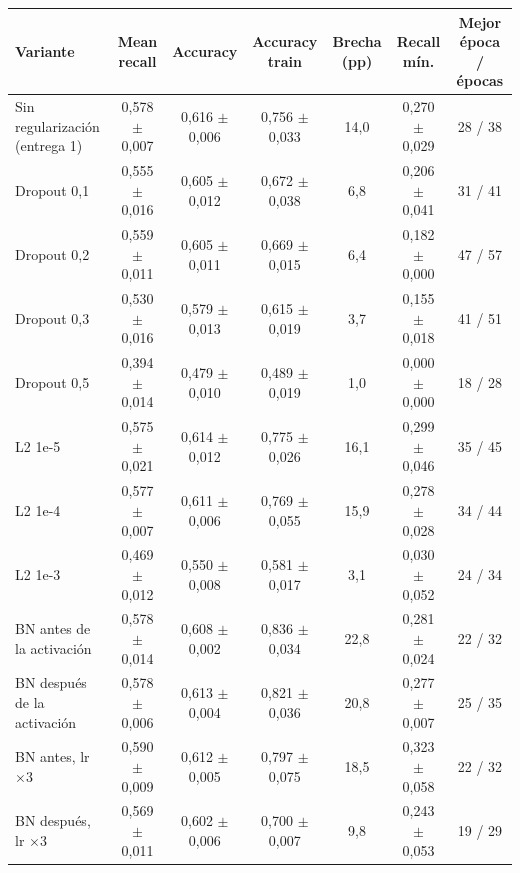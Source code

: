\begin{tabular}{lcccccc}
\toprule
Variante & Mean recall & Accuracy & Accuracy train & Brecha (pp) & Recall mín. & Mejor época / épocas \\
\midrule
Sin regularización (entrega 1) & 0,578 $\pm$ 0,007 & 0,616 $\pm$ 0,006 & 0,756 $\pm$ 0,033 & 14,0 & 0,270 $\pm$ 0,029 & 28 / 38 \\
Dropout 0,1 & 0,555 $\pm$ 0,016 & 0,605 $\pm$ 0,012 & 0,672 $\pm$ 0,038 & 6,8 & 0,206 $\pm$ 0,041 & 31 / 41 \\
Dropout 0,2 & 0,559 $\pm$ 0,011 & 0,605 $\pm$ 0,011 & 0,669 $\pm$ 0,015 & 6,4 & 0,182 $\pm$ 0,000 & 47 / 57 \\
Dropout 0,3 & 0,530 $\pm$ 0,016 & 0,579 $\pm$ 0,013 & 0,615 $\pm$ 0,019 & 3,7 & 0,155 $\pm$ 0,018 & 41 / 51 \\
Dropout 0,5 & 0,394 $\pm$ 0,014 & 0,479 $\pm$ 0,010 & 0,489 $\pm$ 0,019 & 1,0 & 0,000 $\pm$ 0,000 & 18 / 28 \\
L2 1e-5 & 0,575 $\pm$ 0,021 & 0,614 $\pm$ 0,012 & 0,775 $\pm$ 0,026 & 16,1 & 0,299 $\pm$ 0,046 & 35 / 45 \\
L2 1e-4 & 0,577 $\pm$ 0,007 & 0,611 $\pm$ 0,006 & 0,769 $\pm$ 0,055 & 15,9 & 0,278 $\pm$ 0,028 & 34 / 44 \\
L2 1e-3 & 0,469 $\pm$ 0,012 & 0,550 $\pm$ 0,008 & 0,581 $\pm$ 0,017 & 3,1 & 0,030 $\pm$ 0,052 & 24 / 34 \\
BN antes de la activación & 0,578 $\pm$ 0,014 & 0,608 $\pm$ 0,002 & 0,836 $\pm$ 0,034 & 22,8 & 0,281 $\pm$ 0,024 & 22 / 32 \\
BN después de la activación & 0,578 $\pm$ 0,006 & 0,613 $\pm$ 0,004 & 0,821 $\pm$ 0,036 & 20,8 & 0,277 $\pm$ 0,007 & 25 / 35 \\
BN antes, lr $\times$3 & 0,590 $\pm$ 0,009 & 0,612 $\pm$ 0,005 & 0,797 $\pm$ 0,075 & 18,5 & 0,323 $\pm$ 0,058 & 22 / 32 \\
BN después, lr $\times$3 & 0,569 $\pm$ 0,011 & 0,602 $\pm$ 0,006 & 0,700 $\pm$ 0,007 & 9,8 & 0,243 $\pm$ 0,053 & 19 / 29 \\
\bottomrule
\end{tabular}
